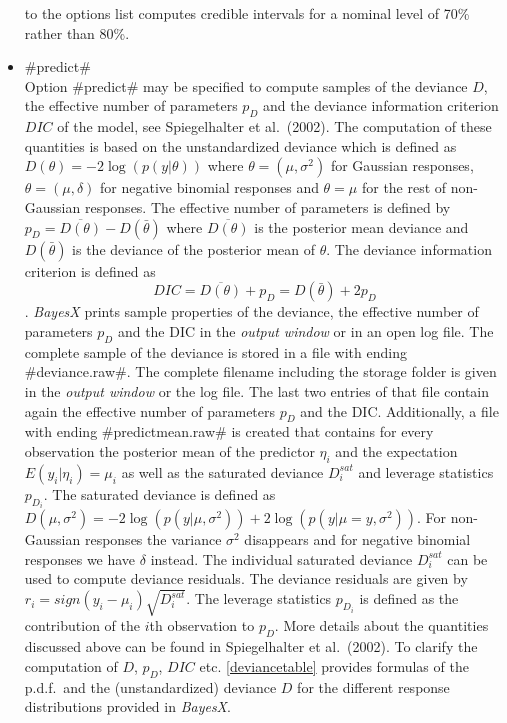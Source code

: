 \begin{itemize}
to the options list computes credible intervals for a nominal
level of 70\% rather than 80\%.

\item \label{predict} #predict# \\
  
   
Option #predict# may be specified to compute samples of the deviance
$D$, the effective number of parameters $p_D$ and the deviance
information criterion $DIC$ of the model, see Spiegelhalter et
al.~(2002). The computation of these quantities is based on the
unstandardized deviance which is defined as $D(\theta) =
-2\log(p(y|\theta))$ where $\theta = (\mu,\sigma^2)$ for Gaussian
responses, $\theta = (\mu,\delta)$ for negative binomial responses
and $\theta = \mu$ for the rest of non-Gaussian responses. The
effective number of parameters is defined by $p_D =
\overline{D(\theta)} - D(\bar{\theta})$ where $\overline{D(\theta)}$
is the posterior mean deviance and $D(\bar{\theta})$ is the deviance
of the posterior mean of $\theta$. The deviance information
criterion is defined as
$$
DIC = \overline{D(\theta)} + p_D = D(\bar{\theta}) + 2 p_D
$$.
{\em
BayesX} prints sample properties of the deviance, the effective
number of parameters $p_D$ and the DIC in the {\em output window} or
in an open log file. The complete sample of the deviance is stored
in a file with ending #deviance.raw#. The complete filename
including the storage folder is given in the {\em output window} or
the log file. The last two entries of that file contain again the
effective number of parameters $p_D$ and the DIC. Additionally, a
file with ending #predictmean.raw# is created that contains for
every observation the posterior mean of the predictor $\eta_i$ and
the expectation $E(y_i | \eta_i) = \mu_i$ as well as the saturated
deviance $D^{sat}_i$ and leverage statistics $p_{D_i}$. The
saturated deviance is defined as $D(\mu,\sigma^2) =
-2\log(p(y|\mu,\sigma^2))+2\log(p(y|\mu=y,\sigma^2))$. For
non-Gaussian responses the variance $\sigma^2$ disappears and for
negative binomial responses we have $\delta$ instead. The individual
saturated deviance $D^{sat}_i$ can be used to compute deviance
residuals. The deviance residuals are given by $r_i =
sign(y_i-\mu_i) \sqrt{D^{sat}_i}$. The leverage statistics $p_{D_i}$
is defined as the contribution of the $i$th observation to $p_D$.
More details about the quantities discussed above can be found in
Spiegelhalter et al.~(2002). To clarify the computation of $D$,
$p_D$, $DIC$ etc. \autoref{deviancetable} provides formulas of the
p.d.f.~and the (unstandardized) deviance $D$ for the different
response distributions provided in {\em BayesX}.
\end{itemize}

